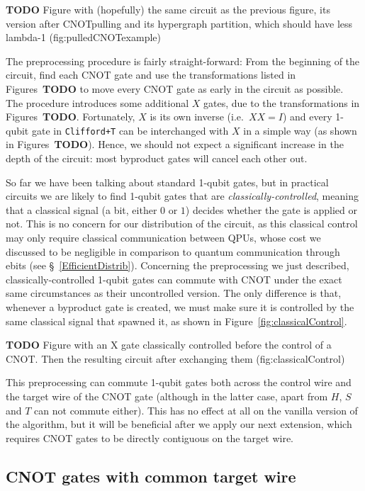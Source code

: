 \textbf{TODO} Figure with (hopefully) the same circuit as the previous figure, its version after CNOTpulling and its hypergraph partition, which should have less lambda-1 (fig:pulledCNOTexample)

The preprocessing procedure is fairly straight-forward: From the beginning of the circuit, find each CNOT gate and use the transformations listed in Figures~\textbf{TODO} to move every CNOT gate as early in the circuit as possible. The procedure introduces some additional \(X\) gates, due to the transformations in Figures~\textbf{TODO}. Fortunately, \(X\) is its own inverse (i.e.\ \(XX = I\)) and every 1-qubit gate in \texttt{Clifford+T} can be interchanged with \(X\) in a simple way (as shown in Figures~\textbf{TODO}). Hence, we should not expect a significant increase in the depth of the circuit: most byproduct gates will cancel each other out.

So far we have been talking about standard 1-qubit gates, but in practical circuits we are likely to find 1-qubit gates that are \textit{classically-controlled}, meaning that a classical signal (a bit, either \(0\) or \(1\)) decides whether the gate is applied or not. This is no concern for our distribution of the circuit, as this classical control may only require classical communication between QPUs, whose cost we discussed to be negligible in comparison to quantum communication through ebits (see \S~\ref{EfficientDistrib}). Concerning the preprocessing we just described, classically-controlled 1-qubit gates can commute with CNOT under the exact same circumstances as their uncontrolled version. The only difference is that, whenever a byproduct gate is created, we must make sure it is controlled by the same classical signal that spawned it, as shown in Figure~\ref{fig:classicalControl}.

\textbf{TODO} Figure with an X gate classically controlled before the control of a CNOT. Then the resulting circuit after exchanging them (fig:classicalControl)

This preprocessing can commute 1-qubit gates both across the control wire and the target wire of the CNOT gate (although in the latter case, apart from \(H\), \(S\) and \(T\) can not commute either). This has no effect at all on the vanilla version of the algorithm, but it will be beneficial after we apply our next extension, which requires CNOT gates to be directly contiguous on the target wire.


\subsection{CNOT gates with common target wire}
\label{BothEnds}

